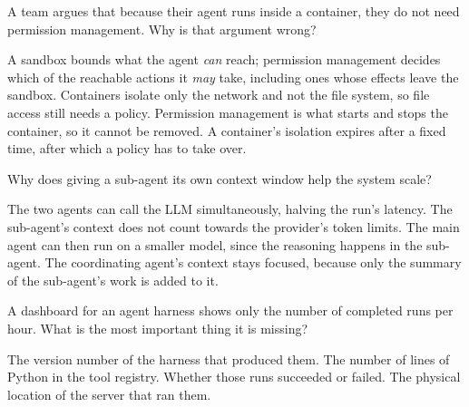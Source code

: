 \begin{questions}
\qitem A team argues that because their agent runs inside a container, they do not need permission
management. Why is that argument wrong?
\begin{choices}
  \CorrectChoice A sandbox bounds what the agent \emph{can} reach; permission management decides which of the reachable actions it \emph{may} take, including ones whose effects leave the sandbox.
  \choice Containers isolate only the network and not the file system, so file access still needs a policy.
  \choice Permission management is what starts and stops the container, so it cannot be removed.
  \choice A container's isolation expires after a fixed time, after which a policy has to take over.
\end{choices}
\dontknow
{}

\qitem Why does giving a sub-agent its own context window help the system scale?
\begin{choices}
  \choice The two agents can call the LLM simultaneously, halving the run's latency.
  \choice The sub-agent's context does not count towards the provider's token limits.
  \choice The main agent can then run on a smaller model, since the reasoning happens in the sub-agent.
  \CorrectChoice The coordinating agent's context stays focused, because only the summary of the sub-agent's work is added to it.
\end{choices}
\dontknow
{}


\qitem A dashboard for an agent harness shows only the number of completed runs per hour. What is the
most important thing it is missing?
\begin{choices}
  \choice The version number of the harness that produced them.
  \choice The number of lines of Python in the tool registry.
  \CorrectChoice Whether those runs succeeded or failed.
  \choice The physical location of the server that ran them.
\end{choices}
\dontknow
{}


\end{questions}
